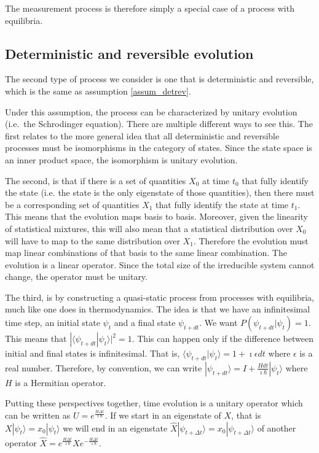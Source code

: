 \documentclass[11pt,letterpaper,fleqn]{memoir} %
\begin{document}
The measurement process is therefore simply a special case of a process with equilibria.

\subsection{Deterministic and reversible evolution}

The second type of process we consider is one that is deterministic and reversible, which is the same as assumption \ref{assum_detrev}.

Under this assumption, the process can be characterized by unitary evolution (i.e.~the Schrodinger equation). There are multiple different ways to see this. The first relates to the more general idea that all deterministic and reversible processes must be isomorphisms in the category of states. Since the state space is an inner product space, the isomorphism is unitary evolution.

The second, is that if there is a set of quantities $X_0$ at time $t_0$ that fully identify the state (i.e. the state is the only eigenstate of those quantities), then there must be a corresponding set of quantities $X_1$ that fully identify the state at time $t_1$. This means that the evolution maps basis to basis. Moreover, given the linearity of statistical mixtures, this will also mean that a statistical distribution over $X_0$ will have to map to the same distribution over $X_1$. Therefore the evolution must map linear combinations of that basis to the same linear combination. The evolution is a linear operator. Since the total size of the irreducible system cannot change, the operator must be unitary.

The third, is by constructing a quasi-static process from processes with equilibria, much like one does in thermodynamics.  The idea is that we have an infinitesimal time step, an initial state $\psi_t$ and a final state $\psi_{t+dt}$. We want $P(\psi_{t+dt} | \psi_t ) = 1$. This means that $|\langle \psi_{t+dt} | \psi_{t} \rangle|^2 = 1$. This can happen only if the difference between initial and final states is infinitesimal. That is, $\langle \psi_{t+dt} | \psi_{t} \rangle = 1 + \imath \epsilon dt$ where $\epsilon$ is a real number. Therefore, by convention, we can write $| \psi_{t+dt} \rangle = I + \frac{H dt}{\imath \hbar} | \psi_{t} \rangle$ where $H$ is a Hermitian operator.

Putting these perspectives together, time evolution is a unitary operator which can be written as $U=e^{\frac{H\Delta t}{\imath \hbar}}$. If we start in an eigenstate of $X$, that is $X | \psi_t \rangle = x_0 | \psi_t \rangle$ we will end in an eigenstate $\hat{X} | \psi_{t + \Delta t} \rangle = x_0 | \psi_{t + \Delta t} \rangle$ of another operator $\hat{X} = e^{\frac{H\Delta t}{\imath \hbar}} X e^{- \frac{H\Delta t}{\imath \hbar}}$.
\end{document}
